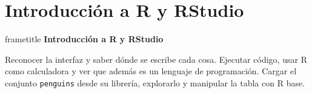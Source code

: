 \documentclass[aspectratio=169,10pt]{beamer}
\newcommand{\hojaSesion}[2]{%
  \vfill
  \begin{beamercolorbox}[wd=\textwidth,sep=16pt,center]{frametitle}
    {\Large\bfseries #1}\\[11pt]
    \begin{minipage}{0.82\textwidth}\centering\small #2\end{minipage}
  \end{beamercolorbox}
  \vfill}
\begin{document}
\section{Introducción a R y RStudio}
\begin{frame}[plain]
  \hojaSesion{Introducción a R y RStudio}{%
  Reconocer la interfaz y saber dónde se escribe cada cosa. Ejecutar código, usar
  R como calculadora y ver que además es un lenguaje de programación. Cargar el conjunto
  \texttt{penguins} desde su librería, explorarlo y manipular la tabla con R base.}
\end{frame}
\end{document}
